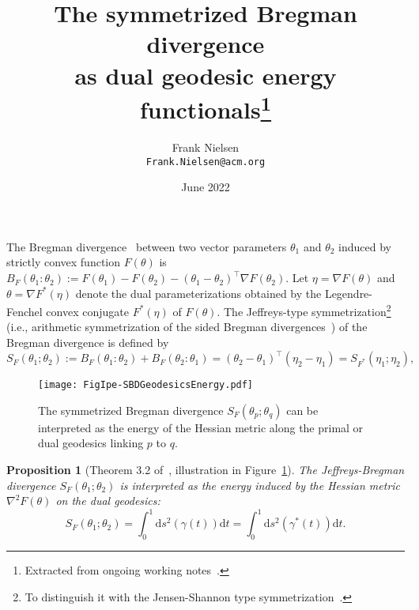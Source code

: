\documentclass[11pt]{article}
\title{The symmetrized Bregman divergence\\ as dual geodesic energy functionals\thanks{Extracted from ongoing working notes~\cite{IG4ML}.}}
\date{June 2022}
\author{Frank Nielsen\\ {\tt Frank.Nielsen@acm.org}}
\def\ds{\mathrm{d}s}
\def\dt{\mathrm{d}t}
\newtheorem{Proposition}{Proposition}
\begin{document}
\maketitle

The Bregman divergence~\cite{Bregman-1967} between two vector parameters $\theta_1$ and $\theta_2$ induced by strictly convex function $F(\theta)$ is $B_F(\theta_1:\theta_2):=F(\theta_1)-F(\theta_2)-(\theta_1-\theta_2)^\top \nabla F(\theta_2)$.
Let $\eta=\nabla F(\theta)$ and $\theta=\nabla F^*(\eta)$ denote the dual parameterizations obtained by the Legendre-Fenchel convex conjugate  $F^*(\eta)$ of $F(\theta)$.
The Jeffreys-type symmetrization\footnote{To distinguish it with the Jensen-Shannon type symmetrization~\cite{JSD-2019}.} (i.e., arithmetic symmetrization of the sided Bregman divergences~\cite{SBD-2009}) of the Bregman divergence is defined by
$$
S_F(\theta_1;\theta_2):=B_F(\theta_1:\theta_2)+B_F(\theta_2:\theta_1)=(\theta_2-\theta_1)^\top (\eta_2-\eta_1)=S_{F^*}(\eta_1;\eta_2),
$$
 
 \begin{figure}[hb]%
\centering
\texttt{[image: FigIpe-SBDGeodesicsEnergy.pdf]}%
\caption{The symmetrized Bregman divergence $S_F(\theta_p;\theta_q)$ can be interpreted as the energy of the Hessian metric along the primal or dual geodesics linking $p$ to $q$.}%
\label{fig:DualGeodesicEnergy}%
\end{figure}


 

\begin{Proposition}[Theorem 3.2 of~\cite{IG-2016}, illustration in Figure~\ref{fig:DualGeodesicEnergy}]
The Jeffreys-Bregman divergence $S_F(\theta_1;\theta_2)$ is interpreted as the energy induced by the Hessian metric $\nabla^2 F(\theta)$ on the dual geodesics:
$$
S_F(\theta_1;\theta_2)=\int_0^1 \ds^2(\gamma(t))\dt=\int_0^1 \ds^2(\gamma^*(t))\dt.
$$ 
\end{Proposition}
\end{document}
